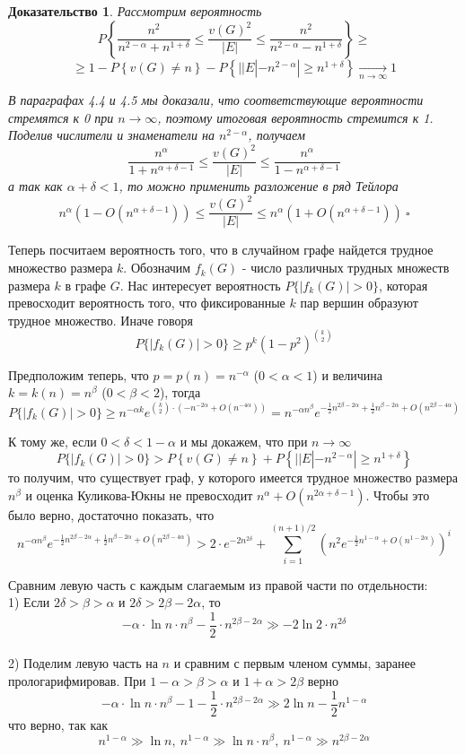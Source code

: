 \documentclass[a4paper]{article}
\newtheorem*{msolution}{Доказательство}
\begin{document}
\begin{msolution}
   Рассмотрим вероятность 
   $$P\left\{\frac{n^2}{n^{2-\alpha} + n^{1+\delta}} \leq \frac{v(G)^2}{|E|} \leq \frac{n^2}{n^{2-\alpha} - n^{1+\delta}} \right\}
    \geq $$ $$ \geq 1 - P\left\{v(G) \neq n\right\} - P\left\{||E| - n^{2-\alpha}| \geq
n^{1+\delta}\right\} \xrightarrow[n \to \infty]{} 1$$

В параграфах 4.4 и 4.5 мы доказали, что соответствующие вероятности стремятся к 0 при $n \to \infty$, 
поэтому итоговая вероятность стремится к 1. Поделив числители и знаменатели на $n^{2-\alpha}$, получаем 
$$\frac{n^{\alpha}}{1 + n^{\alpha + \delta - 1}} \leq \frac{v(G)^2}{|E|} \leq \frac{n^{\alpha}}{1 - n^{\alpha + \delta - 1}}$$
а так как $\alpha + \delta < 1$, то можно применить разложение в ряд Тейлора
$$n^{\alpha}\left(1 - O(n^{\alpha + \delta - 1})\right) \leq \frac{v(G)^2}{|E|} \leq n^{\alpha}\left(1 + O(n^{\alpha + \delta - 1})\right)\ \square$$
\end{msolution}

Теперь посчитаем вероятность того, что в случайном графе найдется трудное множество размера $k$. 
Обозначим $f_k(G)$ - число различных трудных множеств размера $k$ в графе $G$. Нас интересует 
вероятность $P\{|f_k(G)| > 0\}$, которая превосходит вероятность того, что фиксированные $k$ пар 
вершин образуют трудное множество. Иначе говоря $$P\{|f_k(G)| > 0\} \geq p^k\left(1-p^2\right)^{\binom{k}{2}}$$

Предположим теперь, что $p = p(n) = n^{-\alpha}$ ($0 < \alpha < 1$) и величина $k = k(n) = n^{\beta}$ ($0 < \beta < 2$), тогда $$P\{|f_k(G)| > 0\} \geq 
n^{-\alpha k}e^{\binom{k}{2}\cdot(-n^{-2\alpha} + O(n^{-4\alpha}))} = n^{-\alpha n^{\beta}} 
e^{-\frac{1}{2}n^{2\beta-2\alpha} + \frac{1}{2}n^{\beta - 2\alpha} + O(n^{2\beta - 4\alpha})}$$

К тому же, если $0 < \delta < 1 - \alpha$ и мы докажем, что при $n \rightarrow \infty$ $$P\{|f_k(G)| > 0\} > P\left\{v(G) \neq n\right\} + P\left\{||E| - n^{2-\alpha}| \geq
n^{1+\delta}\right\}$$ то получим, что существует граф, у которого имеется трудное множество 
размера $n^\beta$ и оценка Куликова-Юкны не превосходит $n^{\alpha} + O(n^{2\alpha + \delta-1})$. Чтобы это было верно, достаточно показать, что 
$$n^{-\alpha n^{\beta}} e^{-\frac{1}{2}n^{2\beta-2\alpha} + \frac{1}{2}n^{\beta - 2\alpha} + O(n^{2\beta - 4\alpha})} > 
2\cdot e^{-2n^{2\delta}} + \sum\limits_{i=1}^{(n+1)/2}\left(n^2e^{-\frac{1}{2}n^{1-\alpha} + O(n^{1-2\alpha})}\right)^i$$

Сравним левую часть с каждым слагаемым из правой части по отдельности:\ \\
1) Если $2\delta > \beta > \alpha$ и $2\delta > 2\beta - 2\alpha$, то $$-\alpha\cdot \ln{n}\cdot n^{\beta} - 
\frac{1}{2}\cdot n^{2\beta - 2\alpha} \gg -2\ln{2}\cdot n^{2\delta}$$\ \\
2) Поделим левую часть на $n$ и сравним с первым членом суммы, заранее прологарифмировав. При 
$1-\alpha > \beta > \alpha$ и $1+\alpha > 2\beta$ верно $$-\alpha\cdot \ln{n}\cdot n^{\beta} - 1 -
\frac{1}{2}\cdot n^{2\beta - 2\alpha} \gg 2\ln{n} - \frac{1}{2}n^{1-\alpha}$$ что верно, так как 
$$n^{1-\alpha} \gg \ln{n},\ n^{1-\alpha} \gg \ln{n}\cdot n^{\beta},\ n^{1-\alpha} \gg n^{2\beta - 2\alpha}$$
\end{document}
